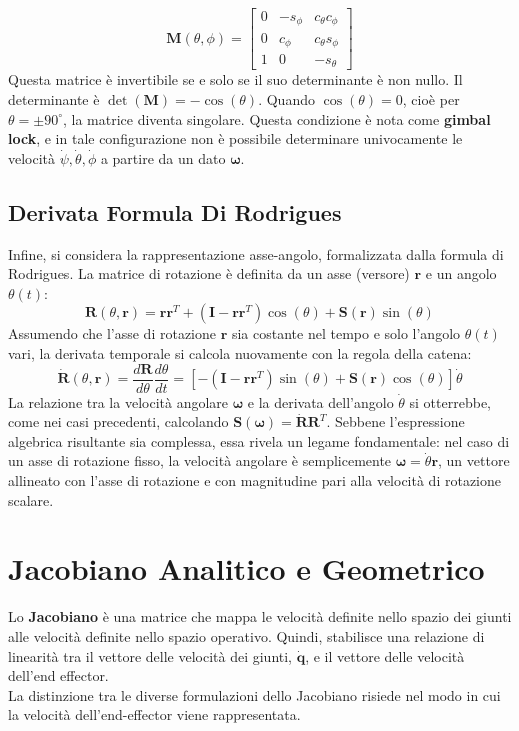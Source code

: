 ﻿\documentclass[11pt, a4paper]{article}
\begin{document}
\[
    \bm{M}(\theta, \phi) =
    \begin{bmatrix}
        0 & -s_{\phi} & c_{\theta}c_{\phi}\\
        0 & c_{\phi} & c_{\theta}s_{\phi}\\
        1 & 0 & -s_{\theta}
    \end{bmatrix}
\]
Questa matrice è invertibile se e solo se il suo determinante è non nullo. Il determinante è \(\det(\bm{M}) = -\cos(\theta)\). Quando \(\cos(\theta) = 0\), cioè per \(\theta = \pm 90^\circ\), la matrice diventa singolare. Questa condizione è nota come \textbf{gimbal lock}, e in tale configurazione non è possibile determinare univocamente le velocità \(\dot{\psi}, \dot{\theta}, \dot{\phi}\) a partire da un dato \(\bm{\omega}\).


\subsection{Derivata Formula Di Rodrigues}
Infine, si considera la rappresentazione asse-angolo, formalizzata dalla formula di Rodrigues. La matrice di rotazione è definita da un asse (versore) \(\bm{r}\) e un angolo \(\theta(t)\):
\[
    \bm{R}(\theta, \bm{r}) = \bm{r}\bm{r}^T + (\bm{I} - \bm{r}\bm{r}^T)\cos(\theta) + \bm{S}(\bm{r})\sin(\theta)
\]
Assumendo che l'asse di rotazione \(\bm{r}\) sia costante nel tempo e solo l'angolo \(\theta(t)\) vari, la derivata temporale si calcola nuovamente con la regola della catena:
\[
    \dot{\bm{R}}(\theta, \bm{r}) = \frac{d\bm{R}}{d\theta}\frac{d\theta}{dt} = \left[ -(\bm{I} - \bm{r}\bm{r}^T)\sin(\theta) + \bm{S}(\bm{r})\cos(\theta) \right] \dot{\theta}
\]
La relazione tra la velocità angolare \(\bm{\omega}\) e la derivata dell'angolo \(\dot{\theta}\) si otterrebbe, come nei casi precedenti, calcolando \(\bm{S}(\bm{\omega}) = \dot{\bm{R}}\bm{R}^T\). Sebbene l'espressione algebrica risultante sia complessa, essa rivela un legame fondamentale: nel caso di un asse di rotazione fisso, la velocità angolare è semplicemente \(\bm{\omega} = \dot{\theta}\bm{r}\), un vettore allineato con l'asse di rotazione e con magnitudine pari alla velocità di rotazione scalare.
\newpage
\section{Jacobiano Analitico e Geometrico}
Lo \textbf{Jacobiano} è una matrice che mappa le velocità definite nello spazio dei giunti alle velocità definite nello spazio operativo. Quindi, stabilisce una relazione di linearità tra il vettore delle velocità dei giunti, \(\dot{\bm{q}}\), e il vettore delle velocità dell'end effector.\\
La distinzione tra le diverse formulazioni dello Jacobiano risiede nel modo in cui la velocità dell'end-effector viene rappresentata.
\end{document}
